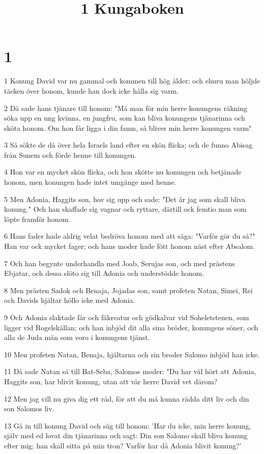 

\title{1 Kungaboken}


\chapter{1}

\par 1 Konung David var nu gammal och kommen till hög ålder; och ehuru man höljde täcken över honom, kunde han dock icke hålla sig varm.
\par 2 Då sade hans tjänare till honom: "Må man för min herre konungens räkning söka upp en ung kvinna, en jungfru, som kan bliva konungens tjänarinna och sköta honom. Om hon får ligga i din famn, så bliver min herre konungen varm"
\par 3 Så sökte de då över hela Israels land efter en skön flicka; och de funno Abisag från Sunem och förde henne till konungen.
\par 4 Hon var en mycket skön flicka, och hon skötte nu konungen och betjänade honom, men konungen hade intet umgänge med henne.
\par 5 Men Adonia, Haggits son, hov sig upp och sade: "Det är jag som skall bliva konung." Och han skaffade sig vagnar och ryttare, därtill ock femtio man som löpte framför honom.
\par 6 Hans fader hade aldrig velat bedröva honom med att säga: "Varför gör du så?" Han var ock mycket fager; och hans moder hade fött honom näst efter Absalom.
\par 7 Och han begynte underhandla med Joab, Serujas son, och med prästens Ebjatar, och dessa slöto sig till Adonia och understödde honom.
\par 8 Men prästen Sadok och Benaja, Jojadas son, samt profeten Natan, Simei, Rei och Davids hjältar höllo icke med Adonia.
\par 9 Och Adonia slaktade får och fäkreatur och gödkalvar vid Soheletstenen, som ligger vid Rogelskällan; och han inbjöd dit alla sina bröder, konungens söner, och alla de Juda män som voro i konungens tjänst.
\par 10 Men profeten Natan, Benaja, hjältarna och sin broder Salomo inbjöd han icke.
\par 11 Då sade Natan så till Bat-Seba, Salomos moder: "Du har väl hört att Adonia, Haggits son, har blivit konung, utan att vår herre David vet därom?
\par 12 Men jag vill nu giva dig ett råd, för att du må kunna rädda ditt liv och din son Salomos liv.
\par 13 Gå in till konung David och säg till honom: 'Har du icke, min herre konung, själv med ed lovat din tjänarinna och sagt: Din son Salomo skall bliva konung efter mig; han skall sitta på min tron? Varför har då Adonia blivit konung?'
